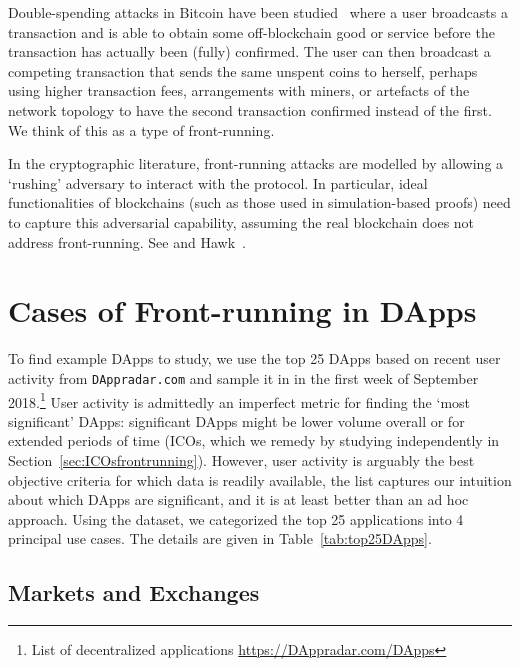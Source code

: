 Double-spending attacks in Bitcoin have been studied~\cite{bamert2013have, karame2012double} where a user broadcasts a transaction and is able to obtain some off-blockchain good or service before the transaction has actually been (fully) confirmed. The user can then broadcast a competing transaction that sends the same unspent coins to herself, perhaps using higher transaction fees, arrangements with miners, or artefacts of the network topology to have the second transaction confirmed instead of the first. We think of this as a type of front-running.

In the cryptographic literature, front-running attacks are modelled by allowing a `rushing' adversary to interact with the protocol. In particular, ideal functionalities of blockchains (such as those used in simulation-based proofs) need to capture this adversarial capability, assuming the real blockchain does not address front-running. See \eg {} and Hawk~\cite{kosba2016hawk}.


\section{Cases of Front-running in DApps}  


To find example DApps to study, we use the top 25 DApps based on recent user activity from \texttt{DAppradar.com} and sample it in in the first week of September 2018.\footnote{List of decentralized applications \url{https://DAppradar.com/DApps}} User activity is admittedly an imperfect metric for finding the `most significant' DApps: significant DApps might be lower volume overall or for extended periods of time (\eg ICOs, which we remedy by studying independently in Section~\ref{sec:ICOsfrontrunning}). However, user activity is arguably the best objective criteria for which data is readily available, the list captures our intuition about which DApps are significant, and it is at least better than an ad hoc approach. Using the dataset, we categorized the top 25 applications into 4 principal use cases. The details are given in Table~\ref{tab:top25DApps}.


\subsection{Markets and Exchanges} \label{sec:frontrunningExchanges}

